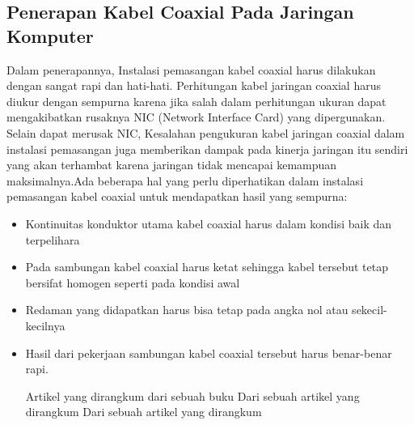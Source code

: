 	\subsection {Penerapan Kabel Coaxial Pada Jaringan Komputer}
	Dalam penerapannya, Instalasi pemasangan kabel coaxial harus dilakukan dengan sangat rapi dan hati-hati. Perhitungan kabel jaringan coaxial harus diukur dengan sempurna karena jika salah dalam perhitungan ukuran dapat mengakibatkan rusaknya NIC (Network Interface Card) yang dipergunakan. Selain dapat merusak NIC, Kesalahan pengukuran kabel jaringan coaxial dalam instalasi pemasangan juga memberikan dampak pada kinerja jaringan itu sendiri yang akan terhambat karena jaringan tidak mencapai kemampuan maksimalnya.Ada beberapa hal yang perlu diperhatikan dalam instalasi pemasangan kabel coaxial untuk mendapatkan hasil yang sempurna:
		\begin{itemize}
			\item Kontinuitas konduktor utama kabel coaxial harus dalam kondisi baik dan terpelihara
			\item Pada sambungan kabel coaxial harus ketat sehingga kabel tersebut tetap bersifat homogen seperti pada kondisi awal
			\item Redaman yang didapatkan harus bisa tetap pada angka nol atau sekecil-kecilnya
			\item Hasil dari pekerjaan sambungan kabel coaxial tersebut harus benar-benar rapi.
	

	
Artikel yang dirangkum dari sebuah buku \cite{syafrizal2005pengantar}
Dari sebuah artikel yang dirangkum \cite{kelik2003pengantar}
Dari sebuah artikel yang dirangkum \cite{beveridge1995method}
\end{itemize}
